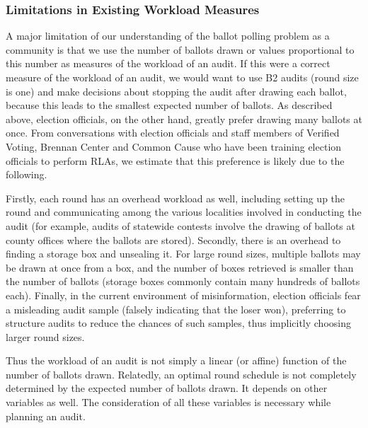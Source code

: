 \subsubsection{Limitations in Existing Workload Measures}
A major limitation of our understanding of the ballot polling problem as a community is that we use the number of ballots drawn or values proportional to this number \cite{mclaughlin_thesis,bernhard-diss,RI-report} as measures of the workload of an audit. If this were a correct measure of the workload of an audit, we would want to use B2 audits (round size is one) and make decisions about stopping the audit after drawing each ballot, because this leads to the smallest expected number of ballots. As described above, election officials, on the other hand, greatly prefer drawing many ballots at once. From conversations with election officials and staff members of Verified Voting, Brennan Center and Common Cause who have been training election officials to perform RLAs, we estimate that this preference is likely due to the following. 

Firstly, each round has an overhead workload as well, including setting up the round and communicating among the various localities involved in conducting the audit (for example, audits of statewide contests involve the drawing of ballots at county offices where the ballots are stored). Secondly, there is an overhead to finding a storage box and unsealing it. For large round sizes, multiple ballots may be drawn at once from a box, and the number of boxes retrieved is smaller than the number of ballots (storage boxes commonly contain many hundreds of ballots each). 
Finally, in the current environment of misinformation, election officials fear a misleading audit sample (falsely indicating that the loser won), preferring to structure audits to reduce the chances of such samples, thus implicitly choosing larger round sizes. 

Thus the workload of an audit is not simply a linear (or affine) function of the number of ballots drawn. Relatedly, an optimal round schedule is not completely determined by the expected number of ballots drawn. It depends on other variables as well. The consideration of all these variables is necessary while planning an audit. 

